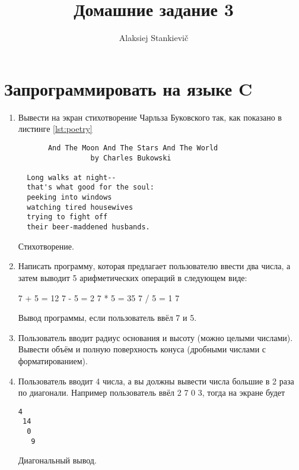 \documentclass[12pt]{article}
\author{Alaksiej Stankievič}
\title{Домашние задание 3}
\begin{document}
 \section{Запрограммировать на языке C}
 \begin{enumerate}
 \item Вывести на экран стихотворение Чарльза Буковского так, как показано в листинге \ref{lst:poetry}
 \begin{listing}[H]
  \begin{center}
   \begin{verbatim}
       And The Moon And The Stars And The World
                 by Charles Bukowski
                 
  Long walks at night--
  that's what good for the soul:
  peeking into windows
  watching tired housewives
  trying to fight off
  their beer-maddened husbands.
   \end{verbatim}
  \end{center}
  \caption{Стихотворение.}
  \label{lst:poetry}
 \end{listing}

  \item Написать программу, которая предлагает пользователю ввести два числа, а затем выводит 5 арифметических операций 
в следующем виде:
\begin{listing}[H]
 \begin{center}
  \begin{bashcode}
7 + 5 = 12
7 - 5 = 2
7 * 5 = 35
7 / 5 = 1
7 %
  \end{bashcode}
 \end{center}
 \caption{Вывод программы, если пользователь ввёл 7 и 5.}
 \label{lst:sampleoutput}
\end{listing}

  \item Пользователь вводит радиус основания и высоту (можно целыми числами). Вывести объём и полную поверхность конуса 
(дробными числами с форматированием).
  \item Пользователь вводит 4 числа, а вы должны вывести числа большие в 2 раза по диагонали. Например пользователь ввёл
  2 7 0 3, тогда на экране будет 
\begin{listing}[H]
  \begin{center}
   \begin{verbatim}
4
 14
  0
   9
   \end{verbatim}
  \end{center}
  \caption{Диагональный вывод.}
  \label{lst:diagonal}
 \end{listing}
  
\end{enumerate}
\end{document}
